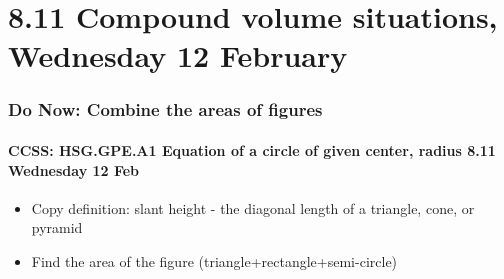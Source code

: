 \documentclass{beamer}
\begin{document}
\section{8.11 Compound volume situations, Wednesday 12 February}
\frame
{
  \frametitle{Do Now: Combine the areas of figures}
  \framesubtitle{CCSS: HSG.GPE.A1 Equation of a circle of given center, radius \hfill \alert{8.11 Wednesday 12 Feb}}

  \begin{itemize}
    \item Copy definition: \alert{slant height} - the diagonal length of a triangle, cone, or pyramid
    \item Find the area of the figure (triangle+rectangle+semi-circle)
  \end{itemize}
  \begin{flushright}
  \end{flushright}
}
\end{document}
